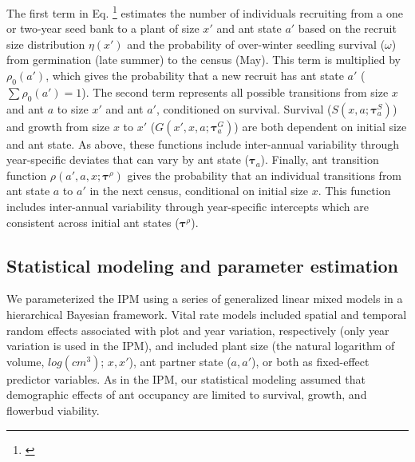 \documentclass[11pt]{article}
\newcommand{\tom}[2]{{\color{red}{#1}}\footnote{\textit{\color{red}{#2}}}}
\begin{document}
\noindent The first term in Eq. \tom{\ref{eqn:IPM2}}{We should label equations. I am not sure why the equation label is not working here and I did not try to figure it out. It is probably something with the linenomath formatting.} estimates the number of individuals recruiting from a one or two-year seed bank to a plant of size $x'$ and ant state $a'$ based on the recruit size distribution $\eta(x')$ and the probability of over-winter seedling survival ($\omega$) from germination (late summer) to the census (May).
This term is multiplied by $\rho_{0}(a')$, which gives the probability that a new recruit has ant state $a'$ ($\sum\rho_{0}(a')=1$). 
The second term represents all possible transitions from size $x$ and ant $a$ to size $x'$ and ant $a'$, conditioned on survival. 
Survival ($S(x,a;\pmb{\tau}^S_{a})$) and growth from size $x$ to $x'$ ($G(x',x,a;\pmb{\tau}^G_{a})$) are both dependent on initial size and ant state. 
As above, these functions include inter-annual variability through year-specific deviates that can vary by ant state ($\pmb{\tau}_{a}$). 
Finally, ant transition function $\rho(a',a,x;\pmb{\tau}^{\rho})$ gives the probability that an individual transitions from ant state $a$ to $a'$ in the next census, conditional on initial size $x$. 
This function includes inter-annual variability through year-specific intercepts which are consistent across initial ant states ($\pmb{\tau}^\rho$).

\subsection*{Statistical modeling and parameter estimation}
We parameterized the IPM using a series of generalized linear mixed models in a hierarchical Bayesian framework. 
Vital rate models included spatial and temporal random effects associated with plot and year variation, respectively (only year variation is used in the IPM), and included plant size (the natural logarithm of volume, $log(cm^3)$; $x,x'$), ant partner state ($a,a'$), or both as fixed-effect predictor variables. 
As in the IPM, our statistical modeling assumed that demographic effects of ant occupancy are limited to survival, growth, and flowerbud viability. 

\end{document}
